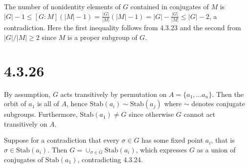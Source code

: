 \documentclass{article}
\def\Stab{\textrm{Stab}}
\begin{document}
The number of nonidentity elements of $G$ contained in conjugates of $M$ is $|G| - 1 \le [G:M] (|M|-1) = \frac{|G|}{|M|}(|M|-1) = |G| - \frac{|G|}{|M|} \le |G| - 2$, a contradiction. Here the first inequality follows from 4.3.23 and the second from $|G| / |M| \ge 2$ since $M$ is a proper subgroup of $G$.

\section*{4.3.26}

By assumption, $G$ acts transitively by permutation on $A = \{a_1, \ldots a_n\}$. Then the orbit of $a_1$ is all of $A$, hence $\Stab(a_i) \sim \Stab(a_j)$ where $\sim$ denotes conjugate subgroups. Furthermore, $\Stab(a_1) \ne G$ since otherwise $G$ cannot act transitively on $A$.

Suppose for a contradiction that every $\sigma \in G$ has some fixed point $a_i$, that is $\sigma \in \Stab(a_i)$. Then $G = \cup_{\sigma \in G} \Stab(a_i)$, which expresses $G$ as a union of conjugates of $\Stab(a_1)$, contradicting 4.3.24.
\end{document}
